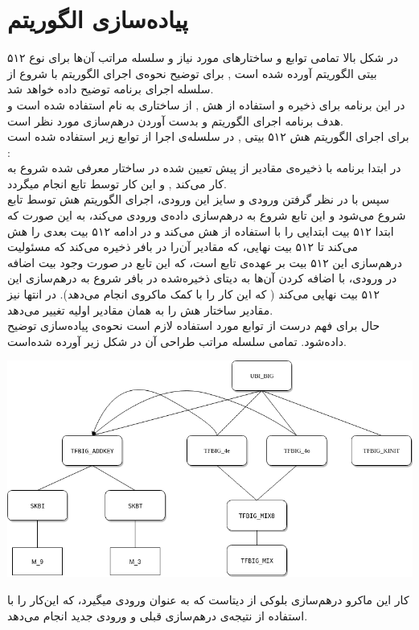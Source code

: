 \section{پیاده‌سازی الگوریتم}
در شکل بالا تمامی توابع و ساختارهای مورد نیاز  و سلسله مراتب آن‌ها برای نوع ۵۱۲ بیتی الگوریتم آورده شده است , برای توضیح نحوه‌ی اجرای الگوریتم با شروع از  
 سلسله اجرای برنامه توضیح داده خواهد شد.
\\
در این برنامه برای ‌ذخیره و استفاده از هش , از ساختاری به نام \hyperref[subsec:sph-skein-big-context]{} استفاده شده است و هدف برنامه اجرای الگوریتم و بدست آوردن درهم‌سازی مورد نظر است.
\\
برای اجرای الگوریتم هش ۵۱۲ بیتی , در سلسله‌ی اجرا از توابع زیر استفاده شده است :
\\
در ابتدا برنامه با ذخیره‌ی مقادیر از پیش تعیین شده  \hyperref[subsec:IV512]{} در ساختار معرفی شده شروع به کار می‌کند , و این کار توسط تابع
\hyperref[subsec:sph-skein512-init]{}
   انجام میگردد.
  \\ سپس با در نظر گرفتن ورودی و سایز این ورودی، اجرای الگوریتم هش  توسط تابع \hyperref[subsec:sph-skein512]{}
   شروع می‌شود و این تابع شروع به درهم‌سازی داده‌ی ورودی می‌کند، به این صورت که ابتدا ۵۱۲ بیت ابتدایی را با استفاده از \hyperref[subsec:UBI-BIG]{} هش می‌کند و در ادامه ۵۱۲ بیت بعدی را هش می‌کند تا ۵۱۲ بیت نهایی،‌  که مقادیر آن‌را   در بافر ذخیره می‌کند که مسئولیت درهم‌سازی این ۵۱۲ بیت بر عهده‌ی تابع \hyperref[subsec:sph-skein512-close]{} است، که این تابع در صورت وجود بیت اضافه در ورودی، با اضافه کردن آن‌ها به دیتای‌ ذخیره‌شده در بافر شروع به درهم‌سازی این ۵۱۲ بیت نهایی می‌کند ( که این کار را با کمک ماکروی  انجام می‌دهد). در انتها نیز مقادیر ساختار هش را به همان مقادیر
 اولیه تغییر می‌دهد.  \\ 
  حال برای فهم درست از توابع مورد استفاده لازم است نحوه‌ی پیاده‌سازی \hyperref[subsec:UBI-BIG]{} توضیح داده‌شود. تمامی سلسله مراتب طراحی آن در شکل زیر آورده شده‌است.
  \begin{center}
  		\includegraphics[width=16cm]{images/UBI.png}	
  \end{center}
  
کار این ماکرو درهم‌سازی بلوکی از دیتاست که به عنوان ورودی میگیرد،‌ که این‌کار را با استفاده از نتیجه‌ی درهم‌سازی قبلی و ورودی جدید انجام می‌دهد.